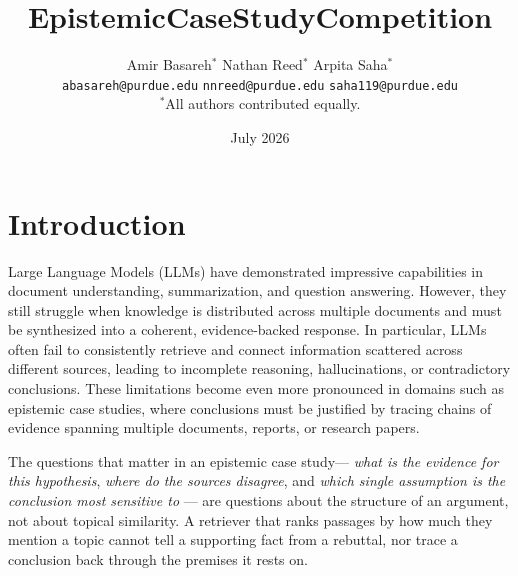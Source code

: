 \documentclass{article}
\title{EpistemicCaseStudyCompetition}
\author{
  Amir Basareh$^{*}$ \quad Nathan Reed$^{*}$ \quad Arpita Saha$^{*}$\\[2pt]
  \small \texttt{abasareh@purdue.edu} \quad \texttt{nnreed@purdue.edu} \quad \texttt{saha119@purdue.edu}\\[4pt]
  \small $^{*}$All authors contributed equally.
}
\date{July 2026}
\begin{document}
\maketitle



\section{Introduction}
Large Language Models (LLMs) have demonstrated impressive capabilities in document understanding, summarization, and question answering. However, they still struggle when knowledge is distributed across multiple documents and must be synthesized into a coherent, evidence-backed response. In particular, LLMs often fail to consistently retrieve and connect information scattered across different sources, leading to incomplete reasoning, hallucinations, or contradictory conclusions. These limitations become even more pronounced in domains such as epistemic case studies, where conclusions must be justified by tracing chains of evidence spanning multiple documents, reports, or research papers.

The questions that matter in an epistemic case study--- \emph{what is the
evidence for this hypothesis}, \emph{where do the sources disagree}, and
\emph{which single assumption is the conclusion most sensitive to} --- are
questions about the structure of an argument, not about topical similarity. A
retriever that ranks passages by how much they mention a topic cannot tell a
supporting fact from a rebuttal, nor trace a conclusion back through the premises
it rests on.
\end{document}
